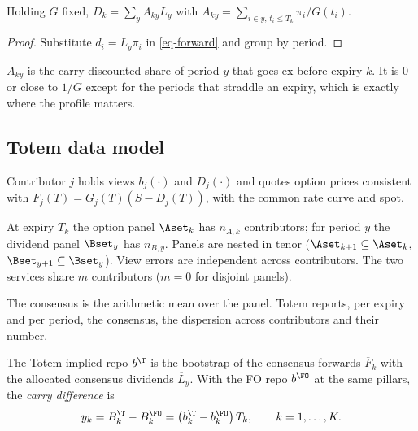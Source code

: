 \begin{lemma}\label{lem-allocation}
Holding $G$ fixed, $D_k=\sum_yA_{ky}L_y$ with $A_{ky}=\sum_{i\in y,\,t_i\le T_k}\pi_i/G(t_i)$.
\end{lemma}
\begin{proof}
Substitute $d_i=L_y\pi_i$ in \cref{eq-forward} and group by period.
\end{proof}
$A_{ky}$ is the carry-discounted share of period $y$ that goes ex before expiry $k$. It is $0$ or close to $1/G$
except for the periods that straddle an expiry, which is exactly where the profile matters.

\subsection{Totem data model}
\begin{assumption}\label{ass-consistent}
Contributor $j$ holds views $b_j(\cdot)$ and $D_j(\cdot)$ and quotes option prices consistent with
$F_j(T)=G_j(T)(S-D_j(T))$, with the common rate curve and spot.
\end{assumption}
\begin{assumption}[Panels]\label{ass-panels}
At expiry $T_k$ the option panel $\Aset_k$ has $n_{A,k}$ contributors; for period $y$ the dividend panel $\Bset_y$
has $n_{B,y}$. Panels are nested in tenor ($\Aset_{k+1}\subseteq\Aset_k$, $\Bset_{y+1}\subseteq\Bset_y$). View errors
are independent across contributors. The two services share $m$ contributors ($m=0$ for disjoint panels).
\end{assumption}
\begin{assumption}[Consensus]\label{ass-consensus}
The consensus is the arithmetic mean over the panel. Totem reports, per expiry and per period, the consensus, the
dispersion across contributors and their number.
\end{assumption}

\begin{definition}\label{def-implied}
The Totem-implied repo $b^\T$ is the bootstrap of the consensus forwards $\overline{F}_k$ with the allocated
consensus dividends $\overline{L}_y$. With the FO repo $b^\FO$ at the same pillars, the \emph{carry difference} is
\begin{equation}\label{eq-y}
y_k=B^\T_k-B^\FO_k=\bigl(b^\T_k-b^\FO_k\bigr)\,T_k,\qquad k=1,\dots,K.
\end{equation}
\end{definition}
